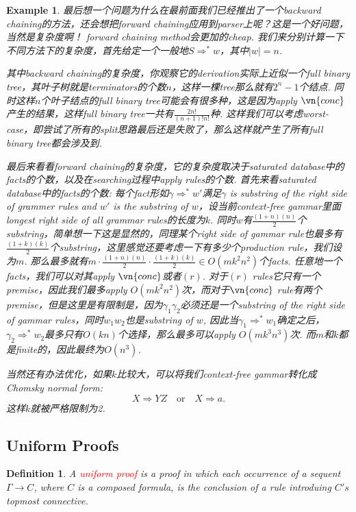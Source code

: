 \documentclass{article}
\theoremstyle{plain}
\newtheorem{example}[theorem]{Example}
\newtheorem{definition}[theorem]{Definition}
\newcounter{case}
\theoremstyle{nonumberplain}
\newcommand{\redt}[1]{\textcolor{red}{#1}}
\begin{document}
\begin{example}
最后想一个问题为什么在最前面我们已经推出了一个backward chaining的方法，还会想把forward chaining应用到parser上呢？这是一个好问题，当然是复杂度啊！ forward chaining method会更加的cheap. 我们来分别计算一下不同方法下的复杂度，首先给定一个一般地$S \Rightarrow^* w$，其中$|w| = n$.

其中backward chaining的复杂度，你观察它的derivation实际上近似一个full binary tree，其叶子树就是terminators的个数$n$，这样一棵tree那么就有$2^n - 1$个结点. 同时这样$n$个叶子结点的full binary tree可能会有很多种，这是因为apply $\vn{conc}$产生的结果，这样full binary tree一共有$\frac{2n!}{(n+1)!n!}$种. 这样我们可以考虑worst-case，即尝试了所有的split思路最后还是失败了，那么这样就产生了所有full binary tree都会涉及到.


最后来看看forward chaining的复杂度，它的复杂度取决于saturated database中的facts的个数，以及在searching过程中apply rules的个数. 首先来看saturated database中的facts的个数: 每个fact形如$\gamma \Rightarrow^* w'$满足$\gamma$ is substring of the right side of grammer rules and $w'$ is the substring of $w$，设当前context-free gammar里面longest right side of all grammar rules的长度为$k$. 同时$w$有$\frac{(1+n)(n)}{2}$个substring，简单想一下这是显然的，同理某个right side of gammar rule也最多有$\frac{(1+k)(k)}{2}$个substring，这里感觉还要考虑一下有多少个production rule，我们设为$m$. 那么最多就有$m \cdot \frac{(1+n)(n)}{2} \cdot \frac{(1+k)(k)}{2} \in O(mk^2n^2)$个facts. 任意地一个facts，我们可以对其apply $\vn{conc}$或者$(r)$. 对于$(r)$ rules它只有一个premise，因此我们最多apply $O(mk^2n^2)$次，而对于$\vn{conc}$ rule有两个premise，但是这里是有限制是，因为$\gamma_1 \gamma_2$必须还是一个substring of the right side of gammar rules，同时$w_1 w_2$也是substring of $w$, 因此当$\gamma_1 \Rightarrow^* w_1$确定之后，$\gamma_2 \Rightarrow^* w_2$最多只有$O(kn)$个选择，那么最多可以apply $O(mk^3n^3)$次. 而$m$和$k$都是finite的，因此最终为$O(n^3)$. 

当然还有办法优化，如果$k$比较大，可以将我们context-free gammar转化成Chomsky normal form:
\[
	X \Rightarrow Y Z \quad\text{or}\quad X \Rightarrow a.
\]
这样$k$就被严格限制为2. 
\end{example}

\newpage
\subsection{Uniform Proofs}

\begin{definition}
\rm A \redt{uniform proof} is a proof in which each occurrence of a sequent $\Gamma \to C$, where $C$ is a composed formula, is the conclusion of a rule introduing $C's$ \emph{topmost} connective. 
\end{definition}
\end{document}

